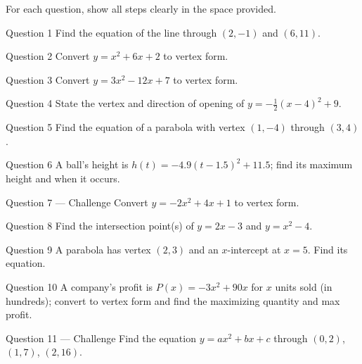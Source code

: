 \documentclass[11pt]{article}
\begin{document}
\clearpage
{}
For each question, show all steps clearly in the space provided.

\begin{qbox}{Question 1}
Find the equation of the line through $(2,-1)$ and $(6,11)$.\workspace{2.4cm}
\end{qbox}

\begin{qbox}{Question 2}
Convert $y=x^2+6x+2$ to vertex form.\workspace{2.4cm}
\end{qbox}

\begin{qbox}{Question 3}
Convert $y=3x^2-12x+7$ to vertex form.\workspace{2.4cm}
\end{qbox}

\begin{qbox}{Question 4}
State the vertex and direction of opening of $y=-\tfrac12(x-4)^2+9$.\workspace{2.4cm}
\end{qbox}

\begin{qbox}{Question 5}
Find the equation of a parabola with vertex $(1,-4)$ through $(3,4)$.\workspace{2.4cm}
\end{qbox}

\begin{qbox}{Question 6}
A ball's height is $h(t)=-4.9(t-1.5)^2+11.5$; find its maximum height and when it occurs.\workspace{2.4cm}
\end{qbox}

\begin{qbox}{Question 7 --- Challenge}
Convert $y=-2x^2+4x+1$ to vertex form.\workspace{3cm}
\end{qbox}

\begin{qbox}{Question 8}
Find the intersection point(s) of $y=2x-3$ and $y=x^2-4$.\workspace{2.4cm}
\end{qbox}

\begin{qbox}{Question 9}
A parabola has vertex $(2,3)$ and an $x$-intercept at $x=5$. Find its equation.\workspace{2.4cm}
\end{qbox}

\begin{qbox}{Question 10}
A company's profit is $P(x)=-3x^2+90x$ for $x$ units sold (in hundreds); convert to vertex form and find the maximizing quantity and max profit.\workspace{2.4cm}
\end{qbox}

\begin{qbox}{Question 11 --- Challenge}
Find the equation $y=ax^2+bx+c$ through $(0,2)$, $(1,7)$, $(2,16)$.\workspace{3.4cm}
\end{qbox}
\end{document}
